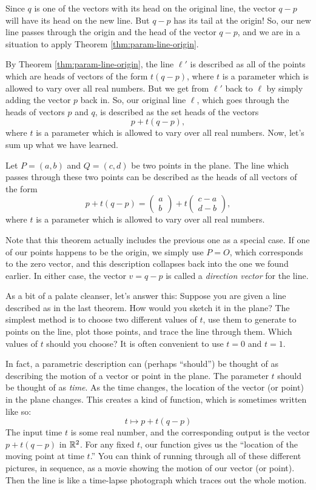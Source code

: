 \documentclass[00-livre-main.tex]{subfiles}
\begin{document}
Since $q$ is one of the vectors with its head on the original line, the vector $q-p$ will have its head on the new line.
But $q-p$ has its tail at the origin!
So, our new line passes through the origin and the head of the vector $q-p$, and we are in a situation to apply Theorem \ref{thm:param-line-origin}.


By Theorem \ref{thm:param-line-origin}, the line $\ell'$ is described as all of the points which are heads of vectors of the form
$t (q-p)$, where $t$ is a parameter which is allowed to vary over all real numbers.
But we get from $\ell'$ back to $\ell$ by simply adding the vector $p$ back in.
So, our original line $\ell$, which goes through the heads of vectors $p$ and $q$, is described as the set heads of the vectors
\[
p + t (q-p),
\]
where $t$ is a parameter which is allowed to vary over all real numbers.
Now, let's sum up what we have learned.

\begin{theorem}\label{thm:param-line}
Let $P = (a,b)$ and $Q = (c,d)$ be two points in the plane. The line which passes through these two points can be described as the heads of all vectors of the form
\[
p+t(q-p) = \begin{pmatrix} a \\ b \end{pmatrix} + t \begin{pmatrix} c-a \\ d-b\end{pmatrix},
\]
where $t$ is a parameter which is allowed to vary over all real numbers.
\end{theorem}

Note that this theorem actually includes the previous one as a special case.
If one of our points happens to be the origin, we simply use $P=O$, which corresponds to the zero vector, and this description collapses back into the one we found earlier.
In either case, the vector $v= q-p$ is called a \emph{direction vector} for the line.


As a bit of a palate cleanser, let's answer this: Suppose you are given a line described as in the last theorem. How would you sketch it in the plane? The simplest method is to choose two different values of $t$, use them to generate to points on the line, plot those points, and trace the line through them. Which values of $t$ should you choose? It is often convenient to use $t=0$ and $t=1$.

In fact, a parametric description can (perhaps ``should'') be thought of as describing the motion of a vector or point in the plane. 
The parameter $t$ should be thought of as \emph{time}.
As the time changes, the location of the vector (or point) in the plane changes.
This creates a kind of function, which is sometimes written like so:
\[
t \mapsto p + t(q-p)
\]
The input time $t$ is some real number, and the corresponding output is the vector $p+t(q-p)$ in $\mathbb{R}^2$. For any fixed $t$, our function gives us the ``location of the moving point at time $t$.'' You can think of running through all of these different pictures, in sequence, as a movie showing the motion of our vector (or point). Then the line is like a time-lapse photograph which traces out the whole motion.
\end{document}
